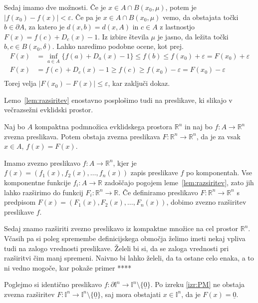 \documentclass[mat1]{fmfdelo}
\newcommand{\R}{\mathbb R}
\newcommand{\I}{\mathbb I}
\newcommand{\0}{\underline{0}}
\begin{document}
\begin{dokaz}
Sedaj imamo dve možnosti. Če je $x \in A \cap B(x_0, \mu)$, potem je $|f(x_0) - f(x)| < \varepsilon$. Če pa je $x \in A \cap B(x_0, \mu)$ vemo, da obstajata točki $b \in \partial A$, za katero je $d(x, b) = d(x, A)$ in $c \in A $ z lastnostjo $F(x) = f(c) + D_c(x) -1$. Iz izbire števila $\mu$ je jasno, da ležita točki $b, c \in B(x_0, \delta)$. Lahko naredimo podobne ocene, kot prej.
 \begin{equation*} \label{eq1}
\begin{split}
F(x) & = \inf_{a \in A} \{ f(a) + D_a(x) - 1\} \leq f(b) \leq f(x_0) +\varepsilon = F(x_0) +\varepsilon\\
F(x) & = f(c) + D_c(x) -1 \geq f(c) \geq f(x_0) - \varepsilon =  F(x_0) -\varepsilon \\
\end{split}
\end{equation*}
 Torej velja $| F(x_0) - F(x) | \leq \varepsilon$, kar zaključi dokaz.
\end{dokaz}

Lemo~\ref{lem:razsiritev} enostavno posplošimo tudi na preslikave, ki slikajo v večrazsežni evklidski prostor.

\begin{posledica}
Naj bo $A$ kompaktna podmnožica evklidskega prostora $\R^n$ in naj bo \mbox{$f : A \to \R^n$} zvezna preslikava. Potem obstaja zvezna preslikava $F : \R^n \to \R^n$, da je za vsak $x \in A$, $f(x) = F(x)$.
\end{posledica}

\begin{dokaz}
Imamo zvezno preslikavo $f : A \to \R^n$, kjer je $f(x) = (f_1(x), f_2(x), \dots , f_n(x))$ zapis preslikave $f$ po komponentah. Vse komponentne funkcije $f_i : A \to \R$ zadoščajo pogojem leme~\ref{lem:razsiritev}, zato jih lahko razširimo do funkcij $F_i : \R^n \to \R$. Če definiramo preslikavo $F : \R^n \to \R^n$ s predpisom $F(x) = (F_1(x), F_2(x), \dots , F_n(x))$, dobimo zvezno razširitev preslikave $f$.
\end{dokaz}
Sedaj znamo razširiti zvezno preslikavo iz kompaktne množice na cel prostor $\R^n$. Včasih pa si poleg spremembe definicijskega območja želimo imeti nekaj vpliva tudi na zalogo vrednosti preslikave. Želeli bi si, da se zaloga vrednosti pri razširitvi čim manj spremeni. Naivno bi lahko želeli, da ta ostane celo enaka, a to ni vedno mogoče, kar pokaže primer ****

\begin{primer}
Poglejmo si identično preslikavo $f : \partial \I^n \to \I^n \setminus \{ \0 \}$. Po izreku \ref{izr:PM} ne obstaja zvezna razširitev $F : \I^n \to \I^n \setminus \{ \0 \}$, saj mora obstajati $x \in \I^n$, da je $F(x) = \0$. 
\end{primer}
\end{document}
